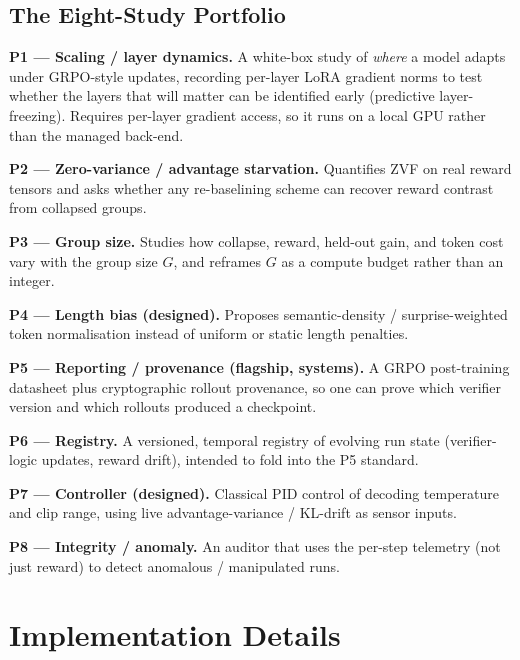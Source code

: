 \documentclass[12pt,a4paper]{report}
\begin{document}
\section{The Eight-Study Portfolio}
\label{sec:portfolio}

\textbf{P1 --- Scaling / layer dynamics.} A white-box study of \emph{where} a model
adapts under GRPO-style updates, recording per-layer LoRA gradient norms to test
whether the layers that will matter can be identified early (predictive
layer-freezing). Requires per-layer gradient access, so it runs on a local GPU
rather than the managed back-end.

\textbf{P2 --- Zero-variance / advantage starvation.} Quantifies ZVF on real reward
tensors and asks whether any re-baselining scheme can recover reward contrast from
collapsed groups.

\textbf{P3 --- Group size.} Studies how collapse, reward, held-out gain, and token
cost vary with the group size $G$, and reframes $G$ as a compute budget rather than
an integer.

\textbf{P4 --- Length bias (designed).} Proposes semantic-density /
surprise-weighted token normalisation instead of uniform or static length penalties.

\textbf{P5 --- Reporting / provenance (flagship, systems).} A GRPO post-training
datasheet plus cryptographic rollout provenance, so one can prove which verifier
version and which rollouts produced a checkpoint.


\textbf{P6 --- Registry.} A versioned, temporal registry of evolving run state
(verifier-logic updates, reward drift), intended to fold into the P5 standard.

\textbf{P7 --- Controller (designed).} Classical PID control of decoding temperature
and clip range, using live advantage-variance / KL-drift as sensor inputs.

\textbf{P8 --- Integrity / anomaly.} An auditor that uses the per-step telemetry
(not just reward) to detect anomalous / manipulated runs.

\chapter{Implementation Details}
\label{ch:impl}
\end{document}
